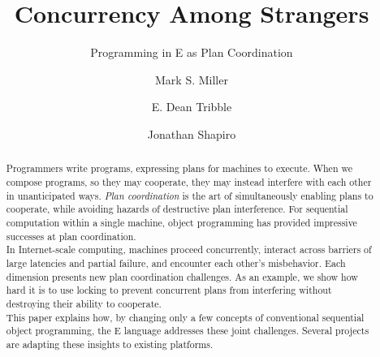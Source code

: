 \documentclass{llncs}
\begin{document}
\newcommand{\name}[1]{{\sf\textsl{#1}}}        %
\newcommand{\vat}[1]{{\sf Vat{#1}}}            %
\newcommand{\pr}[1]{{#1}}                      %
\newcommand{\code}[1]{{\tt {#1}}}              %
\newcommand{\var}[1]{{\tt {#1}}}               %
\newcommand{\dvar}[1]{{\textsl{#1}}}           %
\newcommand{\dobj}[1]{{\textsl{#1}}}           %
\newcommand{\meth}[1]{{\tt {#1}}}              %
\newcommand{\dmeth}[1]{{\tt {#1}}}             %
\newcommand{\cls}[1]{{\tt {#1}}}               %
\newcommand{\ex}[1]{{\tt {#1}}}                %
\newcommand{\abst}[1]{{#1}}                    %
\newcommand{\sys}[1]{{#1}}                     %

\newcommand{\oops}[1]{{(**{#1}**)}}            %

\title{Concurrency Among Strangers}
\subtitle{Programming in E as Plan Coordination}

\author{Mark S. Miller \and 
  E. Dean Tribble \and
  Jonathan Shapiro}


\maketitle

\sloppypar

\begin{abstract}
Programmers write programs, expressing plans for machines to
execute. When we compose programs, so they may cooperate, they may
instead interfere with each other in unanticipated ways. \emph{Plan
coordination} is the art of simultaneously enabling plans to
cooperate, while avoiding hazards of destructive plan
interference. For sequential computation within a single machine,
object programming has provided impressive successes at plan
coordination.\\

In Internet-scale computing, machines proceed concurrently, interact
across barriers of large latencies and partial failure, and encounter
each other's misbehavior. Each dimension presents new plan
coordination challenges. As an example, we show how hard it is to use
locking to prevent concurrent plans from interfering without
destroying their ability to cooperate.\\

This paper explains how, by changing only a few concepts of
conventional sequential object programming, the E language addresses
these joint challenges. Several projects are adapting these insights
to existing platforms.
\end{abstract}
\end{document}
